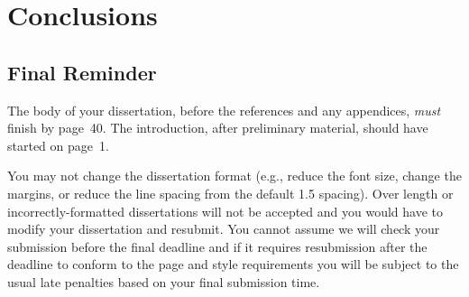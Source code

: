 \documentclass[msc,deptreport.inf]{infthesis} %
\begin{document}
\chapter{Conclusions}

\section{Final Reminder}

The body of your dissertation, before the references and any appendices,
\emph{must} finish by page~40. The introduction, after preliminary material,
should have started on page~1.

You may not change the dissertation format (e.g., reduce the font
size, change the margins, or reduce the line spacing from the default
1.5 spacing). Over length or incorrectly-formatted dissertations will
not be accepted and you would have to modify your dissertation and
resubmit.  You cannot assume we will check your submission before the
final deadline and if it requires resubmission after the deadline to
conform to the page and style requirements you will be subject to the
usual late penalties based on your final submission time.




%
%
%
\end{document}
